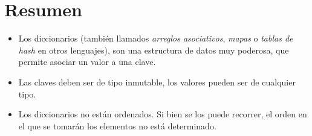 \section{Resumen}

\begin{itemize}
\item Los diccionarios (también llamados {\it arreglos asociativos}, {\it
mapas} o {\it tablas de hash} en otros lenguajes), son una estructura de datos
muy poderosa, que permite asociar un valor a una clave.
\item Las claves deben ser de tipo inmutable, los valores
pueden ser de cualquier tipo.
\item Los diccionarios no están ordenados.  Si bien se los puede recorrer,
el orden en el que se tomarán los elementos no está determinado.
\end{itemize}

